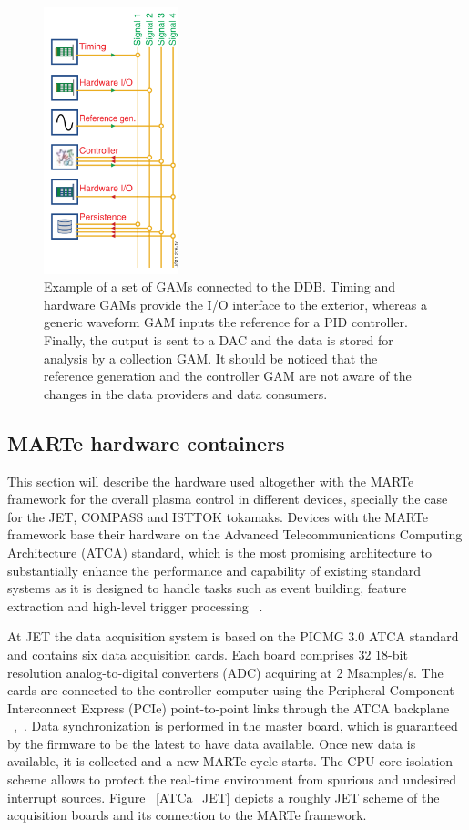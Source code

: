 \begin{figure}[htbp]
	\centering
	\includegraphics[width=0.35\textwidth]{Chp2/GAMs.png}
	\caption{\label{GAMs} Example of a set of GAMs connected to the DDB. Timing and hardware GAMs provide the I/O interface to the exterior, whereas a generic waveform GAM inputs the reference for a PID controller. Finally, the output is sent to a DAC and the data is stored for analysis by a collection GAM.  It should be noticed that the reference generation and the controller GAM are not aware of the changes in the data providers and data consumers.  \cite{MARTe2011}}
	
\end{figure}

\subsection{MARTe hardware containers}

This section will describe the  hardware used altogether with the MARTe framework for the overall plasma control in different devices, specially the case for the JET, COMPASS and ISTTOK tokamaks. Devices with the MARTe framework base their hardware on the  Advanced Telecommunications Computing Architecture (ATCA) standard, which is the most promising architecture to substantially enhance the performance and capability of existing standard systems as it is designed to handle tasks such as event building, feature extraction and high-level trigger processing ~\cite{ATCA2010}.\smallskip

At JET the data acquisition system is based on the PICMG 3.0 ATCA standard  and contains six data acquisition cards. Each board comprises 32 18-bit resolution analog-to-digital converters (ADC) acquiring at 2 Msamples/s. The cards are connected to the controller computer using the Peripheral Component Interconnect Express (PCIe) point-to-point links through the ATCA backplane ~\cite{Neto2010},~\cite{ATCA2006}. Data synchronization is performed in the master board, which is guaranteed by the firmware to be the latest to have data available. Once new data is available, it is collected and a new MARTe cycle starts. The CPU core isolation scheme allows to protect the real-time environment from spurious and undesired interrupt sources. Figure ~\ref{ATCa_JET} depicts a roughly JET scheme of the acquisition boards and its connection to the MARTe framework.  \smallskip

